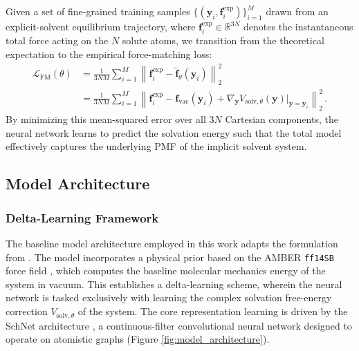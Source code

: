 Given a set of fine-grained training samples $\{(\mathbf{y}_i, \mathbf{f}^{\mathrm{exp}}_i)\}_{i=1}^{M}$ drawn from an explicit-solvent equilibrium trajectory, where $\mathbf{f}^{\mathrm{exp}}_i \in \mathbb{R}^{3N}$ denotes the instantaneous total force acting on the $N$ solute atoms, we transition from the theoretical expectation to the empirical force-matching loss:
\begin{align}
    \mathcal{L}_{\mathrm{FM}}(\theta) &= \frac{1}{3NM}\sum_{i=1}^{M} \left\lVert\mathbf{f}^{\mathrm{exp}}_i - \hat{\mathbf{f}}_{\theta}(\mathbf{y}_i)\right\rVert_2^2 \nonumber \\
    &= \frac{1}{3NM}\sum_{i=1}^{M} \left\lVert\mathbf{f}^{\mathrm{exp}}_i - \mathbf{f}_{\mathrm{vac}}(\mathbf{y}_i) + \nabla_{\mathbf{y}}V_{\mathrm{solv},\theta}(\mathbf{y})\big|_{\mathbf{y}=\mathbf{y}_i}\right\rVert_2^2 \, .
\end{align}
By minimizing this mean-squared error over all $3N$ Cartesian components, the neural network learns to predict the solvation energy such that the total model effectively captures the underlying PMF of the implicit solvent system.


\subsection{Model Architecture}

\subsubsection{Delta-Learning Framework}
The baseline model architecture employed in this work adapts the formulation from \cite{machine_learning_implicit_solvation}. The model incorporates a physical prior based on the AMBER \texttt{ff14SB} force field \citep{maier2015ff14sb}, which computes the baseline molecular mechanics energy of the system in vacuum. This establishes a delta-learning scheme, wherein the neural network is tasked exclusively with learning the complex solvation free-energy correction $V_{\mathrm{solv},\theta}$ of the system. The core representation learning is driven by the SchNet architecture \citep{schutt2018schnet}, a continuous-filter convolutional neural network designed to operate on atomistic graphs (Figure \ref{fig:model_architecture}).


